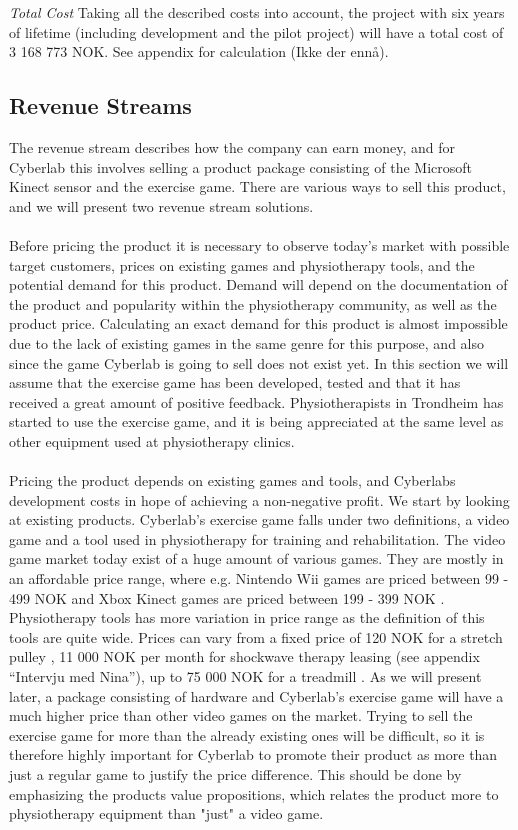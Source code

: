\emph{Total Cost}
Taking all the described costs into account, the project with six years of lifetime (including development and the pilot project) will have a total cost of 3 168 773 NOK. See appendix for calculation (Ikke der ennå).

\subsection{Revenue Streams}
The revenue stream describes how the company can earn money, and for Cyberlab this involves selling a product package consisting of the Microsoft Kinect sensor and the exercise game. There are various ways to sell this product, and we will present two revenue stream solutions.\\ \\
Before pricing the product it is necessary to observe today's market with possible target customers, prices on existing games and physiotherapy tools, and the potential demand for this product. Demand will depend on the documentation of the product and popularity within the physiotherapy community, as well as the product price. Calculating an exact demand for this product is almost impossible due to the lack of existing games in the same genre for this purpose, and also since the game Cyberlab is going to sell does not exist yet. In this section we will assume that the exercise game has been developed, tested and that it has received a great amount of positive feedback. Physiotherapists in Trondheim has started to use the exercise game, and it is being appreciated at the same level as other equipment used at physiotherapy clinics. \\ \\
Pricing the product depends on existing games and tools, and Cyberlabs development costs in hope of achieving a non-negative profit. We start by looking at existing products. Cyberlab's exercise game falls under two definitions, a video game and a tool used in physiotherapy for training and rehabilitation. The video game market today exist of a huge amount of various games. They are mostly in an affordable price range, where e.g. Nintendo Wii games are priced between 99 - 499 NOK \cite{elkjopwii} and Xbox Kinect games are priced between 199 - 399 NOK \cite{elkjopkinect}. Physiotherapy tools has more variation in price range as the definition of this tools are quite wide. Prices can vary from a fixed price of 120 NOK for a stretch pulley \cite{stretchpulley}, 11 000 NOK per month for shockwave therapy leasing (see appendix “Intervju med Nina”), up to 75 000 NOK for a treadmill \cite{treadmill}. As we will present later, a package consisting of hardware and Cyberlab’s exercise game will have a much higher price than other video games on the market. Trying to sell the exercise game for more than the already existing ones will be difficult, so it is therefore highly important for Cyberlab to promote their product as more than just a regular game to justify the price difference. This should be done by emphasizing the products value propositions, which relates the product more to physiotherapy equipment than "just" a video game. \\ \\
